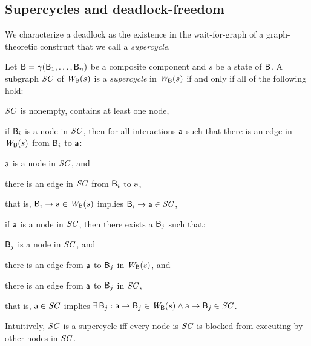 \subsection{Supercycles and deadlock-freedom}

We characterize a deadlock as the existence in the wait-for-graph of a
graph-theoretic construct that we call a {\em supercycle}.

\begin{definition}[Supercycle]
\label{def:supercycle} 
\label{defn:supercycle} 
Let $\mathsf{B} = \gamma(\mathsf{B}_1,\dots,\mathsf{B}_n)$ be a composite component and $s$ be a state of $\mathsf{B}$.
A subgraph $\mathit{SC}$ of $\mathit{W}_{\mathsf{B}}({s})$ is a \emph{supercycle} in $\mathit{W}_{\mathsf{B}}({s})$ if and only if all of the following hold:
\begin{nlst1}
   \item \label{def:supercycle.nonempty} \label{clause:supercycle.nonempty} 
$\mathit{SC}$ is nonempty, \ie contains at least one node,

   \item \label{def:supercycle.component-blocked} \label{clause:supercycle.component-blocked} 
if $\mathsf{B}_i$ is a node in $\mathit{SC}$, then for all interactions $\mathsf{a}$ such that
there is an edge in $\mathit{W}_{\mathsf{B}}({s})$ from $\mathsf{B}_i$ to $\mathsf{a}$:
      \begin{nlst2}
      \item $\mathsf{a}$ is a node in $\mathit{SC}$, and 
      \item there is an edge in $\mathit{SC}$ from $\mathsf{B}_i$ to $\mathsf{a}$,
      \end{nlst2}
that is, $\mathsf{B}_i \rightarrow \mathsf{a} \in \mathit{W}_{\mathsf{B}}({s})$ implies $\mathsf{B}_i \rightarrow \mathsf{a} \in \mathit{SC}$,

   \item \label{def:supercycle.action-blocked}  \label{clause:supercycle.action-blocked}  
if $\mathsf{a}$ is a node in $\mathit{SC}$, then there exists a $\mathsf{B}_j$ such that:
      \begin{nlst2}
      \item $\mathsf{B}_j$  is a node in $\mathit{SC}$, and
      \item there is an edge from $\mathsf{a}$ to $\mathsf{B}_j$ in $\mathit{W}_{\mathsf{B}}({s})$, and
      \item there is an edge from $\mathsf{a}$ to $\mathsf{B}_j$ in $\mathit{SC}$,
      \end{nlst2}
that is, $\mathsf{a} \in \mathit{SC}$ implies $\exists\, \mathsf{B}_j : \mathsf{a} \rightarrow \mathsf{B}_j \in \mathit{W}_{\mathsf{B}}({s}) \land \mathsf{a} \rightarrow \mathsf{B}_j \in \mathit{SC}$.

\end{nlst1}
\end{definition}
Intuitively, $\mathit{SC}$ is a supercycle iff every node is $\mathit{SC}$ is blocked from executing by other nodes in $\mathit{SC}$. 

